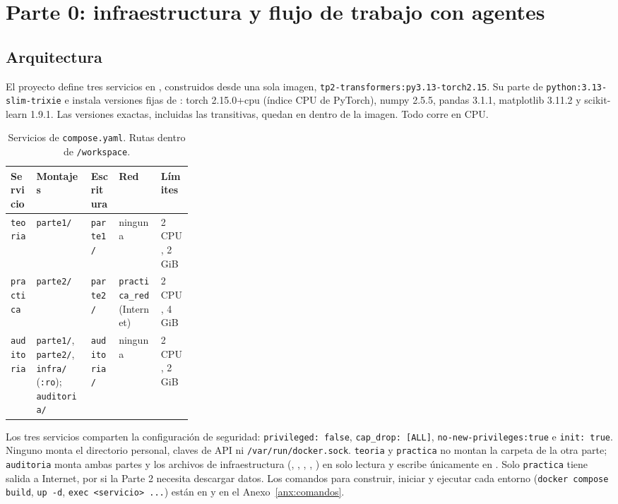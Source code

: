 \documentclass[10pt]{article}
\begin{document}
\section{Parte 0: infraestructura y flujo de trabajo con agentes}

\subsection{Arquitectura}
El proyecto  define tres servicios en , construidos
desde una sola imagen, \texttt{tp2-transformers:py3.13-torch2.15}. Su  parte de
\texttt{python:3.13-slim-trixie} e instala versiones fijas de : torch
2.15.0+cpu (índice CPU de PyTorch), numpy 2.5.5, pandas 3.1.1, matplotlib 3.11.2 y scikit-learn
1.9.1. Las versiones exactas, incluidas las transitivas, quedan en
 dentro de la imagen. Todo corre en CPU.

\begin{table}[H]
  \centering\small
  \caption{Servicios de \texttt{compose.yaml}. Rutas dentro de \texttt{/workspace}.}
  \label{tab:servicios}
  \begin{tabular}{lp{0.3\linewidth}lll}
    \toprule
    Servicio & Montajes & Escritura & Red & Límites \\
    \midrule
    \texttt{teoria}    & \texttt{parte1/} & \texttt{parte1/} & ninguna & 2 CPU, 2 GiB \\
    \texttt{practica}  & \texttt{parte2/} & \texttt{parte2/} & \texttt{practica\_red} (Internet) & 2 CPU, 4 GiB \\
    \texttt{auditoria} & \texttt{parte1/}, \texttt{parte2/}, \texttt{infra/} (\texttt{:ro}); \texttt{auditoria/}
                       & \texttt{auditoria/} & ninguna & 2 CPU, 2 GiB \\
    \bottomrule
  \end{tabular}
\end{table}

\begin{sloppypar}
Los tres servicios comparten la configuración de seguridad: \texttt{privileged: false},
\texttt{cap\_drop: [ALL]}, \texttt{no-new-privileges:true} e \texttt{init: true}. Ninguno monta el
directorio personal, claves de API ni \texttt{/var/run/docker.sock}. \texttt{teoria} y
\texttt{practica} no montan la carpeta de la otra parte; \texttt{auditoria} monta ambas partes y los
archivos de infraestructura (, , ,
, ) en solo lectura y escribe únicamente en . Solo
\texttt{practica} tiene salida a Internet, por si la Parte 2 necesita descargar datos. Los comandos
para construir, iniciar y ejecutar cada entorno (\texttt{docker compose build}, \texttt{up -d},
\texttt{exec <servicio> ...}) están en  y en el Anexo~\ref{anx:comandos}.
\end{sloppypar}
\end{document}
